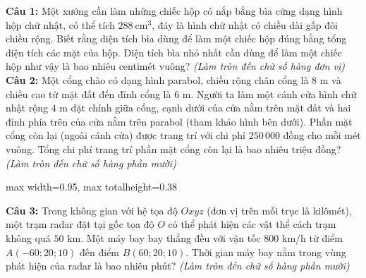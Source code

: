 \documentclass[12pt,a4paper]{article}
\begin{document}
\noindent \textbf{Câu 1:} Một xưởng cần làm những chiếc hộp có nắp bằng bìa cứng dạng hình hộp chữ nhật, có thể tích $288\ \text{cm}^3$, đáy là hình chữ nhật có chiều dài gấp đôi chiều rộng. Biết rằng diện tích bìa dùng để làm một chiếc hộp đúng bằng tổng diện tích các mặt của hộp. Diện tích bìa nhỏ nhất cần dùng để làm một chiếc hộp như vậy là bao nhiêu centimét vuông? \textit{(Làm tròn đến chữ số hàng đơn vị)}\\

\noindent \textbf{Câu 2:} Một cổng chào có dạng hình parabol, chiều rộng chân cổng là $8$ m và chiều cao từ mặt đất đến đỉnh cổng là $6$ m. Người ta làm một cánh cửa hình chữ nhật rộng $4$ m đặt chính giữa cổng, cạnh dưới của cửa nằm trên mặt đất và hai đỉnh phía trên của cửa nằm trên parabol (tham khảo hình bên dưới). Phần mặt cổng còn lại (ngoài cánh cửa) được trang trí với chi phí $250\,000$ đồng cho mỗi mét vuông. Tổng chi phí trang trí phần mặt cổng còn lại là bao nhiêu triệu đồng? \textit{(Làm tròn đến chữ số hàng phần mười)}\\
\begin{center}
\begin{adjustbox}{max width=0.95\linewidth, max totalheight=0.38\textheight}
\end{adjustbox}
\end{center}

\noindent \textbf{Câu 3:} Trong không gian với hệ tọa độ $Oxyz$ (đơn vị trên mỗi trục là kilômét), một trạm radar đặt tại gốc tọa độ $O$ có thể phát hiện các vật thể cách trạm không quá $50$ km. Một máy bay bay thẳng đều với vận tốc $800$ km/h từ điểm $A(-60;20;10)$ đến điểm $B(60;20;10)$. Thời gian máy bay nằm trong vùng phát hiện của radar là bao nhiêu phút? \textit{(Làm tròn đến chữ số hàng phần mười)}\\
\end{document}
